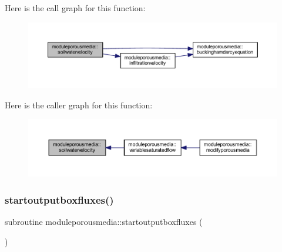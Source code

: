 Here is the call graph for this function\+:\nopagebreak
\begin{figure}[H]
\begin{center}
\leavevmode
\includegraphics[width=350pt]{namespacemoduleporousmedia_a717a5b2d4249d602f98474f7a4c24665_cgraph}
\end{center}
\end{figure}
Here is the caller graph for this function\+:\nopagebreak
\begin{figure}[H]
\begin{center}
\leavevmode
\includegraphics[width=350pt]{namespacemoduleporousmedia_a717a5b2d4249d602f98474f7a4c24665_icgraph}
\end{center}
\end{figure}
\mbox{\label{namespacemoduleporousmedia_a964d0ccee02d1c5d84e0ea29ec30b3e7}} 
\subsubsection{\texorpdfstring{startoutputboxfluxes()}{startoutputboxfluxes()}}
{\footnotesize\ttfamily subroutine moduleporousmedia\+::startoutputboxfluxes (\begin{DoxyParamCaption}{ }\end{DoxyParamCaption})\hspace{0.3cm}{\ttfamily [private]}}

